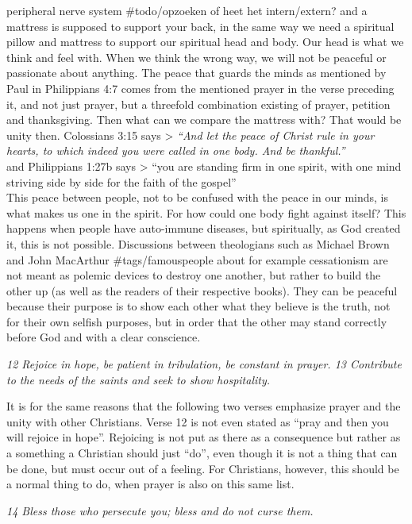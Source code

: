 peripheral nerve system \#todo/opzoeken of heet het intern/extern? and a
mattress is supposed to support your back, in the same way we need a
spiritual pillow and mattress to support our spiritual head and body.
Our head is what we think and feel with. When we think the wrong way, we
will not be peaceful or passionate about anything. The peace that guards
the minds as mentioned by Paul in Philippians 4:7 comes from the
mentioned prayer in the verse preceding it, and not just prayer, but a
threefold combination existing of prayer, petition and thanksgiving.
Then what can we compare the mattress with? That would be unity then.
Colossians 3:15 says \textgreater{} \emph{``And let the peace of Christ
rule in your hearts, to which indeed you were called in one body. And be
thankful.''}\\
and Philippians 1:27b says \textgreater{} ``you are standing firm in one
spirit, with one mind striving side by side for the faith of the
gospel''\\
This peace between people, not to be confused with the peace in our
minds, is what makes us one in the spirit. For how could one body fight
against itself? This happens when people have auto-immune diseases, but
spiritually, as God created it, this is not possible. Discussions
between theologians such as Michael Brown and John MacArthur
\#tags/famouspeople about for example cessationism are not meant as
polemic devices to destroy one another, but rather to build the other up
(as well as the readers of their respective books). They can be peaceful
because their purpose is to show each other what they believe is the
truth, not for their own selfish purposes, but in order that the other
may stand correctly before God and with a clear conscience.

\emph{12 Rejoice in hope, be patient in tribulation, be constant in
prayer. 13 Contribute to the needs of the saints and seek to show
hospitality.}

It is for the same reasons that the following two verses emphasize
prayer and the unity with other Christians. Verse 12 is not even stated
as ``pray and then you will rejoice in hope''. Rejoicing is not put as
there as a consequence but rather as a something a Christian should just
``do'', even though it is not a thing that can be done, but must occur
out of a feeling. For Christians, however, this should be a normal thing
to do, when prayer is also on this same list.

\emph{14 Bless those who persecute you; bless and do not curse them.}

